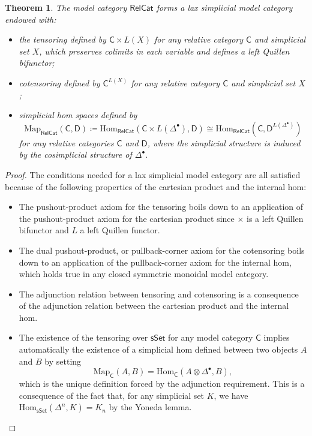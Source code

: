 \documentclass[a4paper,12pt]{amsart}
\theoremstyle{plain}
\newtheorem{theorem}{Theorem}[section]
\theoremstyle{definition}
\theoremstyle{remark}
\begin{document}
\begin{theorem}\label{thm: lax simplicial tensoring and cotensoring}
The model category $\mathsf{RelCat}$ forms a lax simplicial model category endowed with:

\begin{itemize}
\item[(1)] the tensoring defined by $\mathsf{C} \times L(X)$ for any relative category $\mathsf{C}$ and simplicial set $X$, which preserves colimits in each variable and defines a left Quillen bifunctor;


\item[(2)] cotensoring defined by $\mathsf{C}^{L(X)}$ for any relative category $\mathsf{C}$ and simplicial set $X$;


\item[(3)] simplicial hom spaces defined by
\[
\mathrm{Map}_{\mathsf{RelCat}}(\mathsf{C},\mathsf{D}) \coloneqq \mathrm{Hom}_{\mathsf{RelCat}}(\mathsf{C}\times L(\Delta^{\bullet}),\mathsf{D})\cong \mathrm{Hom}_{\mathsf{RelCat}}(\mathsf{C},\mathsf{D}^{L(\Delta^{\bullet})})
\]
for any relative categories $\mathsf{C}$ and $\mathsf{D}$, where the simplicial structure is induced by the cosimplicial structure of $\Delta^{\bullet}$.
\end{itemize}
\end{theorem}
\begin{proof}
The conditions needed for a lax simplicial model category are all satisfied because of the following properties of the cartesian product and the internal hom: 
\begin{itemize}
\item The pushout-product axiom for the tensoring boils down to an application of the pushout-product axiom for the cartesian product since $\times$ is a left Quillen bifunctor and $L$ a left Quillen functor.

\item The dual pushout-product, or pullback-corner axiom for the cotensoring boils down to an application of the pullback-corner axiom for the internal hom, which holds true in any closed symmetric monoidal model category.

\item The adjunction relation between tensoring and cotensoring is a consequence of the adjunction relation between the cartesian product and the internal hom.

\item The existence of the tensoring over $\mathsf{sSet}$ for any model category $\mathsf{C}$ implies automatically the existence of a simplicial hom defined between two objects $A$ and $B$ by setting 
\[
\mathrm{Map}_{\mathsf{C}}(A,B)= \mathrm{Hom}_{\mathsf{C}}(A \otimes \Delta^{\bullet},B),
\]
which is the unique definition forced by the adjunction requirement. This is a consequence of the fact that, for any simplicial set $K$, we have $\mathrm{Hom}_{\mathsf{sSet}}(\Delta^n,K)= K_n$ by the Yoneda lemma.
\end{itemize}
\end{proof}
\end{document}
